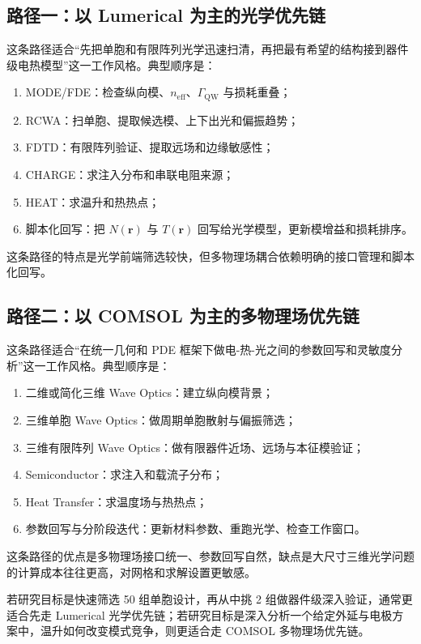 \subsection*{路径一：以 Lumerical 为主的光学优先链}
这条路径适合“先把单胞和有限阵列光学迅速扫清，再把最有希望的结构接到器件级电热模型”这一工作风格。典型顺序是：
\begin{enumerate}
  \item MODE/FDE：检查纵向模、$n_{\mathrm{eff}}$、$\Gamma_{\mathrm{QW}}$ 与损耗重叠；
  \item RCWA：扫单胞、提取候选模、上下出光和偏振趋势；
  \item FDTD：有限阵列验证、提取远场和边缘敏感性；
  \item CHARGE：求注入分布和串联电阻来源；
  \item HEAT：求温升和热热点；
  \item 脚本化回写：把 $N(\mathbf{r})$ 与 $T(\mathbf{r})$ 回写给光学模型，更新模增益和损耗排序。
\end{enumerate}
这条路径的特点是光学前端筛选较快，但多物理场耦合依赖明确的接口管理和脚本化回写。

\subsection*{路径二：以 COMSOL 为主的多物理场优先链}
这条路径适合“在统一几何和 PDE 框架下做电-热-光之间的参数回写和灵敏度分析”这一工作风格。典型顺序是：
\begin{enumerate}
  \item 二维或简化三维 Wave Optics：建立纵向模背景；
  \item 三维单胞 Wave Optics：做周期单胞散射与偏振筛选；
  \item 三维有限阵列 Wave Optics：做有限器件近场、远场与本征模验证；
  \item Semiconductor：求注入和载流子分布；
  \item Heat Transfer：求温度场与热热点；
  \item 参数回写与分阶段迭代：更新材料参数、重跑光学、检查工作窗口。
\end{enumerate}
这条路径的优点是多物理场接口统一、参数回写自然，缺点是大尺寸三维光学问题的计算成本往往更高，对网格和求解设置更敏感。

若研究目标是快速筛选 50 组单胞设计，再从中挑 2 组做器件级深入验证，通常更适合先走 Lumerical 光学优先链；若研究目标是深入分析一个给定外延与电极方案中，温升如何改变模式竞争，则更适合走 COMSOL 多物理场优先链。

